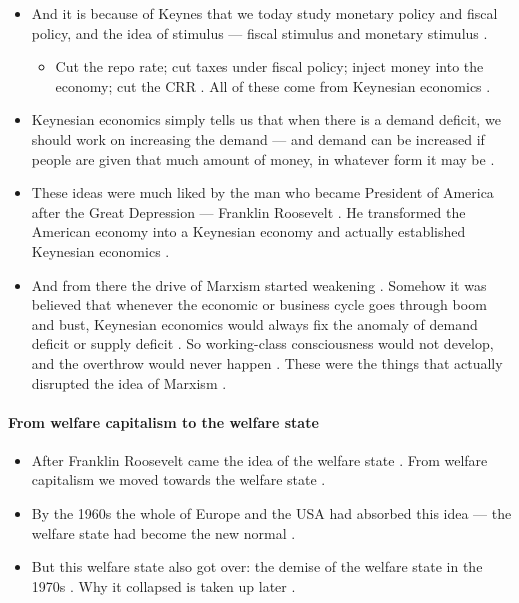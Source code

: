 \begin{itemize}
    \item And it is because of Keynes that we today study monetary policy and fiscal policy, and the idea of stimulus --- fiscal stimulus and monetary stimulus .
    \begin{itemize}
        \item Cut the repo rate; cut taxes under fiscal policy; inject money into the economy; cut the CRR . All of these come from Keynesian economics .
    \end{itemize}
    \item Keynesian economics simply tells us that when there is a demand deficit, we should work on increasing the demand --- and demand can be increased if people are given that much amount of money, in whatever form it may be .
    \item These ideas were much liked by the man who became President of America after the Great Depression --- Franklin Roosevelt . He transformed the American economy into a Keynesian economy and actually established Keynesian economics .
    \item And from there the drive of Marxism started weakening . Somehow it was believed that whenever the economic or business cycle goes through boom and bust, Keynesian economics would always fix the anomaly of demand deficit or supply deficit . So working-class consciousness would not develop, and the overthrow would never happen . These were the things that actually disrupted the idea of Marxism .
\end{itemize}

\paragraph{From welfare capitalism to the welfare state}
\begin{itemize}
    \item After Franklin Roosevelt came the idea of the welfare state . From welfare capitalism we moved towards the welfare state .
    \item By the 1960s the whole of Europe and the USA had absorbed this idea --- the welfare state had become the new normal .
    \item But this welfare state also got over: the demise of the welfare state in the 1970s . Why it collapsed is taken up later .
\end{itemize}

